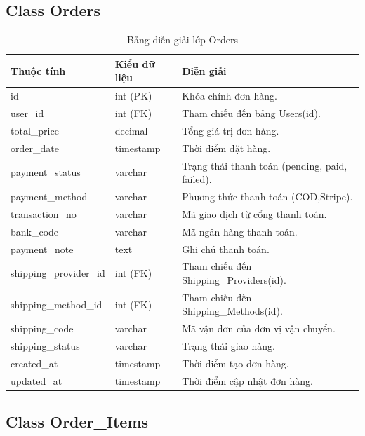 \subsection{Class Orders}

\begin{table}[H]
\centering
\caption{Bảng diễn giải lớp Orders}
\label{tab:orders}
\begin{tabular}{|l|l|p{7cm}|}
\hline
\textbf{Thuộc tính} & \textbf{Kiểu dữ liệu} & \textbf{Diễn giải} \\ \hline
id & int (PK) & Khóa chính đơn hàng. \\ \hline
user\_id & int (FK) & Tham chiếu đến bảng Users(id). \\ \hline
total\_price & decimal & Tổng giá trị đơn hàng. \\ \hline
order\_date & timestamp & Thời điểm đặt hàng. \\ \hline
payment\_status & varchar & Trạng thái thanh toán (pending, paid, failed). \\ \hline
payment\_method & varchar & Phương thức thanh toán (COD,Stripe). \\ \hline
transaction\_no & varchar & Mã giao dịch từ cổng thanh toán. \\ \hline
bank\_code & varchar & Mã ngân hàng thanh toán. \\ \hline
payment\_note & text & Ghi chú thanh toán. \\ \hline
shipping\_provider\_id & int (FK) & Tham chiếu đến Shipping\_Providers(id). \\ \hline
shipping\_method\_id & int (FK) & Tham chiếu đến Shipping\_Methods(id). \\ \hline
shipping\_code & varchar & Mã vận đơn của đơn vị vận chuyển. \\ \hline
shipping\_status & varchar & Trạng thái giao hàng. \\ \hline
created\_at & timestamp & Thời điểm tạo đơn hàng. \\ \hline
updated\_at & timestamp & Thời điểm cập nhật đơn hàng. \\ \hline
\end{tabular}
\end{table}

\subsection{Class Order\_Items}

